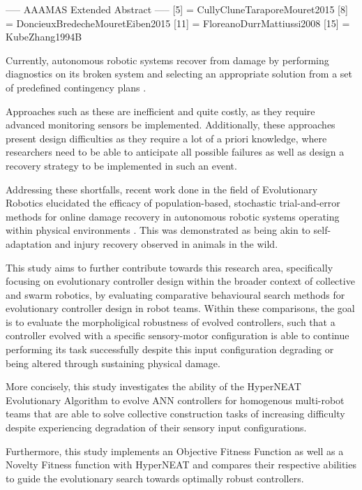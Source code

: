 ----- AAAMAS Extended Abstract -----
[5] = CullyCluneTaraporeMouret2015
[8] = DoncieuxBredecheMouretEiben2015
[11] = FloreanoDurrMattiussi2008
[15] = KubeZhang1994B

Currently, autonomous robotic systems recover from damage by performing diagnostics on its broken system and selecting an appropriate solution from a set of predefined contingency plans \cite{fenton2001fault, verma2004real, BongardZykovLipson2006}. 

Approaches such as these are inefficient and quite costly, as they require advanced monitoring sensors be implemented. 
Additionally, these approaches present design difficulties as they require a lot of a priori knowledge, where researchers need to be able to anticipate all possible failures as well as design a recovery strategy to be implemented in such an event.

Addressing these shortfalls, recent work done in the field of Evolutionary Robotics \cite{DoncieuxBredecheMouretEiben2015} elucidated the efficacy of population-based, stochastic trial-and-error methods for online damage recovery in autonomous robotic systems operating within physical environments \cite{DoncieuxBredecheMouretEiben2015}. This was demonstrated as being akin to self-adaptation and injury recovery observed in animals in the wild.

This study aims to further contribute towards this research area, specifically focusing on evolutionary controller design \cite{FloreanoDurrMattiussi2008} within the broader context of collective \cite{KubeZhang1994B} and swarm \cite{FloreanoDurrMattiussi2008} robotics, by evaluating comparative behavioural search methods for evolutionary controller design in robot teams. Within these comparisons, the goal is to evaluate the morpholigical robustness of evolved controllers, such that a controller evolved with a specific sensory-motor configuration is able to continue performing its task successfully despite this input configuration degrading or being altered through sustaining physical damage.

More concisely, this study investigates the ability of the HyperNEAT Evolutionary Algorithm \cite{StanleyDAmbrosioGauci2009} to evolve ANN controllers for homogenous multi-robot teams that are able to solve collective construction tasks \cite{NitschkeSaEC2012} of increasing difficulty despite experiencing degradation of their sensory input configurations.

Furthermore, this study implements an Objective Fitness Function as well as a Novelty Fitness function with HyperNEAT and compares their respective abilities to guide the evolutionary search towards optimally robust controllers.

